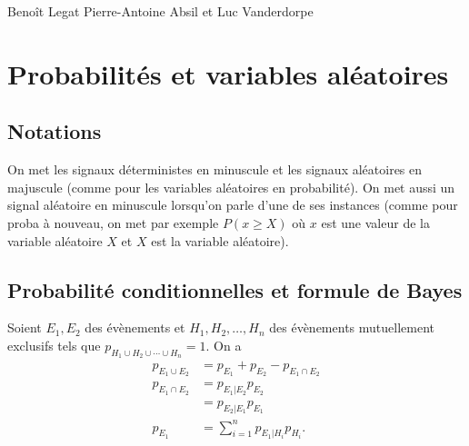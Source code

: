 

\usepackage{qtree}

\def\Perp{\perp\!\!\!\perp}

\renewcommand{\E}{\mathbb{E}}
\newcommand{\N}{\mathcal{N}}
\DeclareMathOperator{\var}{\mathbb{V}ar}
\DeclareMathOperator{\cov}{Cov}
\DeclareMathOperator{\bias}{Bias}

\DeclareMathOperator{\bin}{Bin}
\DeclareMathOperator{\expo}{Expo}
\DeclareMathOperator{\gammad}{Gamma}
\DeclareMathOperator{\po}{Po}

\newcommand{\fourier}{\mathcal{F}}
\newcommand{\esth}{\hat{\theta}}
\newcommand{\esthn}[1]{\esth^{\mathrm{#1}}}
\newcommand{\esthls}{\esthn{LS}}
\newcommand{\esthcm}{\esthn{CM}}
\newcommand{\esthmap}{\esthn{MAP}}
\newcommand{\esthml}{\esthn{ML}}
\newcommand{\esthblue}{\esthn{BLUE}}
\newcommand{\esthlmmse}{\esthn{LMMSE}}
\newcommand{\msethf}{\mathrm{MSE}_{\esth;\theta}}
\newcommand{\msethb}{\mathrm{MSE}_{\esth}}

{Benoît Legat}
{Pierre-Antoine Absil et Luc Vanderdorpe}

\newcommand{\Ex}[1]{\E\left\{#1\right\}}


\section{Probabilités et variables aléatoires}
\subsection{Notations}
On met les signaux déterministes en minuscule et les signaux aléatoires en majuscule (comme pour les variables aléatoires en probabilité).
On met aussi un signal aléatoire en minuscule lorsqu'on parle d'une de ses instances (comme pour proba à nouveau, on met par exemple $P(x \geq X)$ où $x$ est une valeur de la variable aléatoire $X$ et $X$ est la variable aléatoire).

\subsection{Probabilité conditionnelles et formule de Bayes}
Soient $E_1, E_2$ des évènements et $H_1, H_2, \ldots, H_n$ des évènements mutuellement exclusifs tels que $p_{H_1 \cup H_2 \cup \cdots \cup H_n} = 1$.
On a
\begin{align*}
  p_{E_1 \cup E_2} & = p_{E_1} + p_{E_2} - p_{E_1 \cap E_2}\\
  p_{E_1 \cap E_2} & = p_{E_1|E_2} p_{E_2}\\
                   & = p_{E_2|E_1} p_{E_1}\\
  p_{E_1}          & = \sum_{i=1}^n p_{E_1|H_i} p_{H_i}.
\end{align*}

